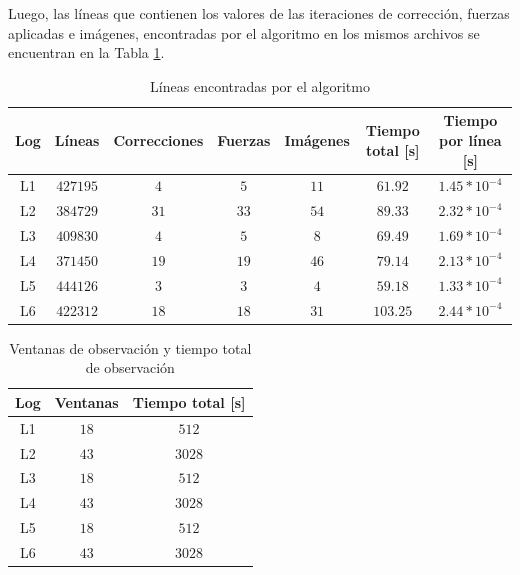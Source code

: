 Luego, las líneas que contienen los valores de las iteraciones de corrección, fuerzas aplicadas e imágenes, encontradas por el algoritmo en los mismos archivos se encuentran en la Tabla \ref{table:auto}.

\begin{table}[h]
    \centering
    \ttfamily
    \begin{tabular}{|c|c|c|c|c|c|c|}
        \hline
        Log & Líneas & Correcciones & Fuerzas & Imágenes & Tiempo total [s] & Tiempo por línea [s]\\
        \hline \hline
        L1 & $427195$ & $4$ & $5$ & $11$ & $61.92$ & $1.45 * 10^{-4}$ \\
        \hline
        L2 & $384729$ & $31$ & $33$ & $54$ & $89.33$ & $2.32 * 10^{-4}$ \\
        \hline
        L3 & $409830$ & $4$ & $5$ & $8$ & $69.49$ & $1.69 * 10^{-4}$ \\
        \hline
        L4 & $371450$ & $19$ & $19$ & $46$ & $79.14$ & $2.13 * 10^{-4}$ \\
        \hline
        L5 & $444126$ & $3$ & $3$ & $4$ & $59.18$ & $1.33 * 10^{-4}$ \\
        \hline
        L6 & $422312$ & $18$ & $18$ & $31$ & $103.25$ & $2.44 * 10^{-4}$ \\
        \hline
    \end{tabular}
    \caption{\label{table:auto} Líneas encontradas por el algoritmo}
\end{table}

\begin{table}[h]
    \centering
    \ttfamily
    \begin{tabular}{|c|c|c|}
        \hline
        Log & Ventanas & Tiempo total [s]\\
        \hline \hline
        L1 & $18$ & $512$ \\
        \hline
        L2 & $43$ & $3028$ \\
        \hline
        L3 & $18$ & $512$ \\
        \hline
        L4 & $43$ & $3028$ \\
        \hline
        L5 & $18$ & $512$ \\
        \hline
        L6 & $43$ & $3028$ \\
        \hline
    \end{tabular}
    \caption{\label{table:ventanas} Ventanas de observación y tiempo total de observación}
\end{table}

